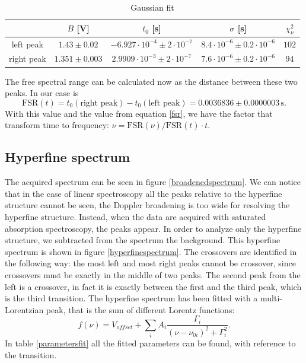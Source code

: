 \documentclass[a4paper,10pt]{article}
\begin{document}
\begin{table}[H]
      \centering
\begin{tabular}{c|c|c|c|c}
           & $B$ [V] & $t_0$ [s] & $\sigma$ [s]& $\chi^2_\nu$\\
           \hline
           left peak & $  1.43\pm  0.02$ & $ -6.927\cdot 10^{-4}\pm 2\cdot 10^{-7} $ & $8.4\cdot 10^{-6}\pm   0.2\cdot 10^{-6}$ & $102$\\
           right peak & $ 1.351\pm 0.003$ & $2.9909\cdot 10^{-3}\pm 2\cdot 10^{-7}$ & $7.6\cdot 10^{-6}\pm  0.2\cdot 10^{-6}$ & $94$\\
           \hline
        \end{tabular}
        \caption{Gaussian fit}
\end{table}
The free spectral range can be calculated now as the distance between these two peaks. In our case is
\begin{equation}\text{FSR}(t) = t_0(\text{right peak}) - t_0(\text{left peak}) = 0.0036836 \pm 0.0000003\, \text{s}.\end{equation}
With this value and the value from equation \eqref{fsr}, we have the factor that transform time to frequency: $\nu = \text{FSR}(\nu)/\text{FSR}(t)\cdot t$.
\subsection{Hyperfine spectrum}
The acquired spectrum can be seen in figure \ref{broadenedspectrum}. We can notice that in the case of linear spectroscopy all the peaks relative to the hyperfine structure cannot be seen, the Doppler broadening is too wide for resolving the hyperfine structure. Instead, when the data are acquired with saturated absorption spectroscopy, the peaks appear. In order to analyze only the hyperfine structure, we subtracted from the spectrum the background. This hyperfine spectrum is shown in figure \ref{hyperfinespectrum}. The crossovers are identified in the following way: the most left and most right peaks cannot be crossover, since crossovers must be exactly in the middle of two peaks. The second peak from the left is a crossover, in fact it is exactly between the first and the third peak, which is the third transition.
The hyperfine spectrum has been fitted with a multi-Lorentzian peak, that is the sum of different Lorentz functions:
\begin{equation}f(\nu) = V_{offset}+\sum_{i} A_i \frac{\Gamma_i}{(\nu-\nu_{0i})^2 + \Gamma_i^2}. \end{equation}
In table \ref{parametersfit} all the fitted parameters can be found, with reference to the transition.
\end{document}
